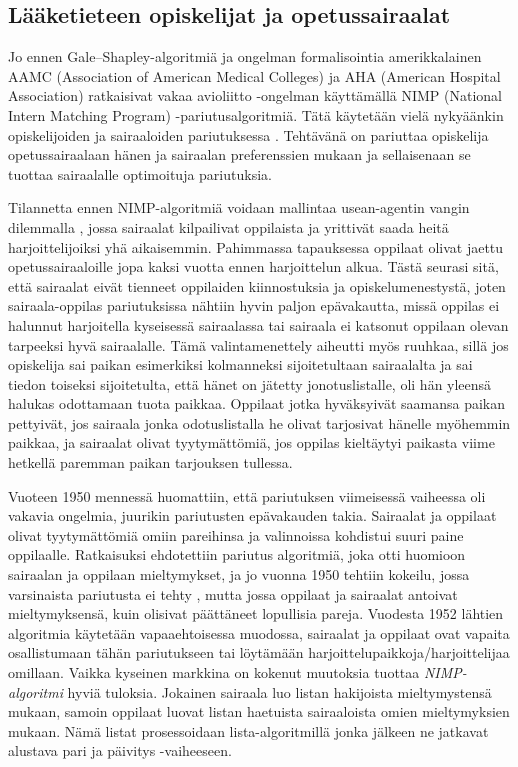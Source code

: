 \documentclass[finnish]{tktltiki2}
\theoremstyle{definition}
\theoremstyle{remark}
\begin{document}
\subsection{Lääketieteen opiskelijat ja opetussairaalat}
Jo ennen Gale--Shapley-algoritmiä ja ongelman formalisointia amerikkalainen AAMC (Association of American Medical Colleges) ja AHA (American Hospital Association) ratkaisivat vakaa avioliitto -ongelman käyttämällä NIMP (National Intern Matching Program) -pariutusalgoritmiä. Tätä käytetään vielä nykyäänkin opiskelijoiden ja sairaaloiden pariutuksessa \cite{roth84}. Tehtävänä on pariuttaa opiskelija opetussairaalaan hänen ja sairaalan preferenssien mukaan ja sellaisenaan se tuottaa sairaalalle optimoituja pariutuksia.

Tilannetta ennen NIMP-algoritmiä voidaan mallintaa usean-agentin vangin dilemmalla \cite{roth84}, jossa sairaalat kilpailivat oppilaista ja yrittivät saada heitä harjoittelijoiksi yhä aikaisemmin. Pahimmassa tapauksessa oppilaat olivat jaettu opetussairaaloille jopa kaksi vuotta ennen harjoittelun alkua. Tästä seurasi sitä, että sairaalat eivät tienneet oppilaiden kiinnostuksia ja opiskelumenestystä, joten sairaala-oppilas pariutuksissa nähtiin hyvin paljon epävakautta, missä oppilas ei halunnut harjoitella kyseisessä sairaalassa tai sairaala ei katsonut oppilaan olevan tarpeeksi hyvä sairaalalle. Tämä valintamenettely aiheutti myös ruuhkaa, sillä jos opiskelija sai paikan esimerkiksi kolmanneksi sijoitetultaan sairaalalta ja sai tiedon toiseksi sijoitetulta, että hänet on jätetty jonotuslistalle, oli hän yleensä halukas odottamaan tuota paikkaa. Oppilaat jotka hyväksyivät saamansa paikan pettyivät, jos sairaala jonka odotuslistalla he olivat tarjosivat hänelle myöhemmin paikkaa, ja sairaalat olivat tyytymättömiä, jos oppilas kieltäytyi paikasta viime hetkellä paremman paikan tarjouksen tullessa.

Vuoteen 1950 mennessä huomattiin, että pariutuksen viimeisessä vaiheessa oli vakavia ongelmia, juurikin pariutusten epävakauden takia. Sairaalat ja oppilaat olivat tyytymättömiä omiin pareihinsa ja valinnoissa kohdistui suuri paine oppilaalle. Ratkaisuksi ehdotettiin pariutus algoritmiä, joka otti huomioon sairaalan ja oppilaan mieltymykset, ja jo vuonna 1950 tehtiin kokeilu, jossa varsinaista pariutusta ei tehty \cite{roth84}, mutta jossa oppilaat ja sairaalat antoivat mieltymyksensä, kuin olisivat päättäneet lopullisia pareja. Vuodesta 1952 lähtien algoritmia käytetään vapaaehtoisessa muodossa, sairaalat ja oppilaat ovat vapaita osallistumaan tähän pariutukseen tai löytämään harjoittelupaikkoja/harjoittelijaa omillaan. Vaikka kyseinen markkina on kokenut muutoksia tuottaa \emph{NIMP-algoritmi} hyviä tuloksia.
Jokainen sairaala luo listan hakijoista mieltymystensä mukaan, samoin oppilaat luovat listan haetuista sairaaloista omien mieltymyksien mukaan. Nämä listat prosessoidaan lista-algoritmillä jonka jälkeen ne jatkavat alustava pari ja päivitys -vaiheeseen.
\end{document}
